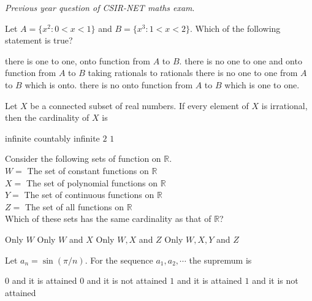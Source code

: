 \documentclass[10pt]{exam}
\begin{document}
 
\noindent \emph{Previous year question of CSIR-NET maths exam}. 
\begin{questions}

\question
Let $A=\{x^2:0<x<1 \}$ and $B=\{x^3:1<x<2 \}$. Which of the following statement is true?
\begin{choices}
\choice there is one to one, onto function from $A$ to $B$. 
\choice there is no one to one and onto function from $A$ to $B$ taking rationals to rationals  
\choice there is no one to one from $A$ to $B$ which is onto.
\choice there is no onto function from $A$ to $B$ which is one to one.
\end{choices}

\question
Let $X$ be a connected subset of real numbers. If every element of $X$ is irrational, then the cardinality of $X$ is 

\begin{oneparchoices}
\choice infinite 
\choice countably infinite
\choice $2$
\choice $1$
\end{oneparchoices}

\question 
Consider the following sets of function on $\mathbb{R}$. \\
$W = $ The set of constant functions on $\mathbb{R}$ \\ 
$X = $ The set of polynomial functions on $\mathbb{R}$ \\ 
$Y = $ The set of continuous functions on $\mathbb{R}$ \\ 
$Z = $ The set of all        functions on $\mathbb{R}$ \\ 
Which of these sets has the same cardinality as that of $\mathbb{R}$?

\begin{oneparchoices}
\choice Only $W$
\choice Only $W$ and $X$ 
\choice Only $W,X$ and $Z$ 
\choice Only $W, X, Y$ and $Z$ 
\end{oneparchoices}

\question
Let $a_n=\sin(\pi/n)$. For the sequence $a_1, a_2, \cdots$ the supremum is 

\begin{choices}
\choice $0$ and it is attained
\choice $0$ and it is not attained
\choice $1$ and it is attained
\choice $1$ and it is not attained
\end{choices}


\end{questions}
\end{document}
